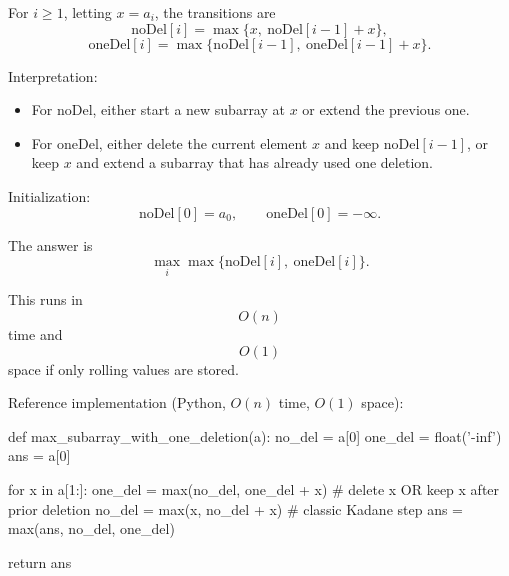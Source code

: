 \documentclass[11pt,letterpaper,openany]{book}
\begin{document}
For \(i \ge 1\), letting \(x=a_i\), the transitions are
\[
\mathrm{noDel}[i] = \max\{x,\ \mathrm{noDel}[i-1]+x\},
\]
\[
\mathrm{oneDel}[i] = \max\{\mathrm{noDel}[i-1],\ \mathrm{oneDel}[i-1]+x\}.
\]

Interpretation:
\begin{itemize}
\item For \(\mathrm{noDel}\), either start a new subarray at \(x\) or extend the previous one.
\item For \(\mathrm{oneDel}\), either delete the current element \(x\) and keep \(\mathrm{noDel}[i-1]\), or keep \(x\) and extend a subarray that has already used one deletion.
\end{itemize}

Initialization:
\[
\mathrm{noDel}[0] = a_0,
\qquad
\mathrm{oneDel}[0] = -\infty.
\]

The answer is
\[
\max_i \max\{\mathrm{noDel}[i],\ \mathrm{oneDel}[i]\}.
\]

This runs in
\[
O(n)
\]
time and
\[
O(1)
\]
space if only rolling values are stored.

Reference implementation (Python, \(O(n)\) time, \(O(1)\) space):
\begin{codeblock}
def max_subarray_with_one_deletion(a):
    no_del = a[0]
    one_del = float('-inf')
    ans = a[0]

    for x in a[1:]:
        one_del = max(no_del, one_del + x)   # delete x OR keep x after prior deletion
        no_del = max(x, no_del + x)          # classic Kadane step
        ans = max(ans, no_del, one_del)

    return ans
\end{codeblock}
\end{document}
